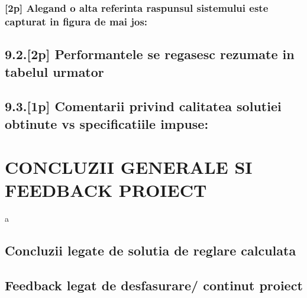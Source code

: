 \documentclass[12pt,english]{article}
\begin{document}
\subsubsection { [2p] Alegand o alta referinta raspunsul sistemului este capturat in figura de mai jos: }
\subsection { 9.2.[2p] Performantele se regasesc rezumate in tabelul urmator }
\subsection { 9.3.[1p] Comentarii privind calitatea solutiei obtinute vs specificatiile impuse: }

\section { CONCLUZII GENERALE SI FEEDBACK PROIECT }
a
\subsection { Concluzii legate de solutia de reglare calculata }
\subsection { Feedback legat de desfasurare/ continut proiect }
\end{document}
